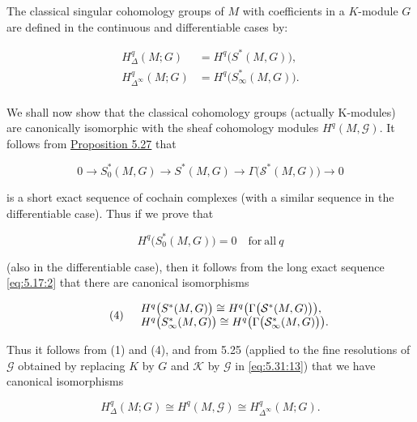The classical singular cohomology groups of $M$ with coefficients in a $K$-module $G$ are defined in the continuous and differentiable cases by:

\begin{equation}
\tag{1}\label{eq:5.32:1}
\begin{aligned}{H_{\Delta}^{q}(M;G)}&{{}=H^{q}\big(S^{*}(M,G)\big),}\\ {H_{\Delta^{\infty}}^{q}(M;G)}&{{}=H^{q}\big(S_{\infty}^{*}(M,G)\big).}\\ \end{aligned}
\end{equation}

We shall now show that the classical cohomology groups (actually K-modules) are canonically isomorphic with the sheaf cohomology modules  $H^{q}(M,\mathcal{G})$. It follows from \hyperref[thm:5.27]{Proposition 5.27} that

\begin{equation}
\tag{2}\label{eq:5.32:2}
0\to S_{0}^{*}(M,G)\to S^{*}(M,G)\to\Gamma\bigl(\mathcal{S}^{*}(M,G)\bigr)\to0
\end{equation}

is a short exact sequence of cochain complexes (with a similar sequence in the differentiable case). Thus if we prove that

\begin{equation}
\tag{3}\label{eq:5.32:3}
H^{q}\bigl(S_{0}^{*}(M,G)\bigr)=0\quad\mathrm{for\ all}\ q
\end{equation}

(also in the differentiable case), then it follows from the long exact sequence \eqref{eq:5.17:2} that there are canonical isomorphisms

\begin{equation}
\tag{4}\label{eq:5.32:4}
\begin{array}{r l}&{H^{q}\big(S^{*}(M,G)\big)\cong H^{q}\big(\Gamma\big(\mathcal{S}^{*}(M,G)\big)\big),}\\ &{H^{q}\big(S_{\infty}^{*}(M,G)\big)\cong H^{q}\big(\Gamma\big(\mathcal{S}_{\infty}^{*}(M,G)\big)\big).}\end{array}
\end{equation}

Thus it follows from (1) and (4), and from 5.25 (applied to the fine resolutions of $\mathcal{G}$ obtained by replacing $K$ by $G$ and $\mathcal{K}$ by $\mathcal{G}$ in \eqref{eq:5.31:13}) that we have canonical isomorphisms

\begin{equation}
\tag{5}\label{eq:5.32:5}
H_{\Delta}^{q}(M;G)\cong H^{q}(M,\mathcal{G})\cong H_{\Delta^{\infty}}^{q}(M;G).
\end{equation}

